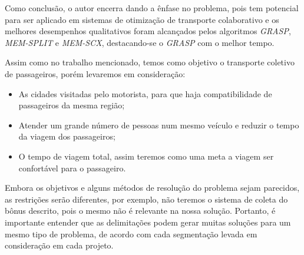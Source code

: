 Como conclusão, o autor encerra dando a ênfase no problema, pois tem potencial para ser aplicado em sistemas de otimização de transporte colaborativo e os melhores desempenhos qualitativos foram alcançados pelos algoritmos \emph{GRASP}, \emph{MEM-SPLIT} e \emph{MEM-SCX}, destacando-se o \emph{GRASP} com o melhor tempo.

Assim como no trabalho mencionado, temos como objetivo o transporte coletivo de passageiros, porém levaremos em consideração:
\begin{itemize}
    \item As cidades visitadas pelo motorista, para que haja compatibilidade de passageiros da mesma região;
    \item Atender um grande número de pessoas num mesmo veículo e reduzir o tempo da viagem dos passageiros; 
    

    \item O tempo de viagem total, assim teremos como uma meta a viagem ser confortável para o passageiro.
\end{itemize}

Embora os objetivos e alguns métodos de resolução do problema sejam parecidos, as restrições serão diferentes, por exemplo, não teremos o sistema de coleta do bônus descrito, pois o mesmo não é relevante na nossa solução. Portanto, é importante entender que as delimitações podem gerar muitas soluções para um mesmo tipo de problema, de acordo com cada segmentação levada em consideração em cada projeto.

